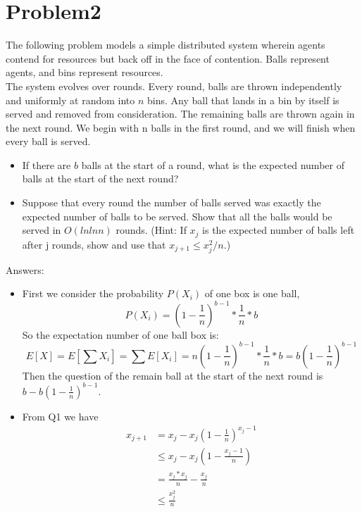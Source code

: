 \documentclass[12pt]{article}
\begin{document}
\section{Problem2}
The following problem models a simple distributed system wherein agents contend for resources but back off in the face of contention. Balls represent agents, and bins represent resources.\\
The system evolves over rounds. Every round, balls are thrown independently and uniformly at random into $n$ bins. Any ball that lands in a bin by itself is served and removed from consideration. The remaining balls are thrown again in the next round. We begin with n balls in the first round, and we will finish when every ball is served.
\begin{itemize}
\item If there are $b$ balls at the start of a round, what is the expected number of balls at the start of the next round?
\item Suppose that every round the number of balls served was exactly the expected number of balls to be served. Show that all the balls would be served in $O(ln ln n)$ rounds. (Hint: If $x_j$ is the expected number of balls left after j rounds, show and use that $x_{j+1} \le x^2_j/n$.)

\end{itemize}

Answers:
\begin{itemize}
\item First we consider the probability $P(X_i)$ of one box is one ball,
\begin{equation}
    P(X_i) = (1-\frac{1}{n})^{b-1}*\frac{1}{n}*b
\end{equation}
So the expectation number of one ball box is:
\begin{equation}
    E[X] = E[\sum X_i] = \sum E[X_i] = n(1-\frac{1}{n})^{b-1}*\frac{1}{n}*b = b(1-\frac{1}{n})^{b-1}
\end{equation}
Then the question of the remain ball at the start of the next round is $b-b(1-\frac{1}{n})^{b-1}$.

\item
From Q1 we have
\begin{equation}
    \begin{split}
    x_{j+1} &= x_j - x_j(1-\frac{1}{n})^{x_j-1}\\
    &\le x_j - x_j (1-\frac{x_j-1}{n})\\
    &= \frac{x_j*x_j}{n}-\frac{x_j}{n}\\
    &\le \frac{x_j^2}{n}
    \end{split}
\end{equation}
\end{itemize}
\end{document}
